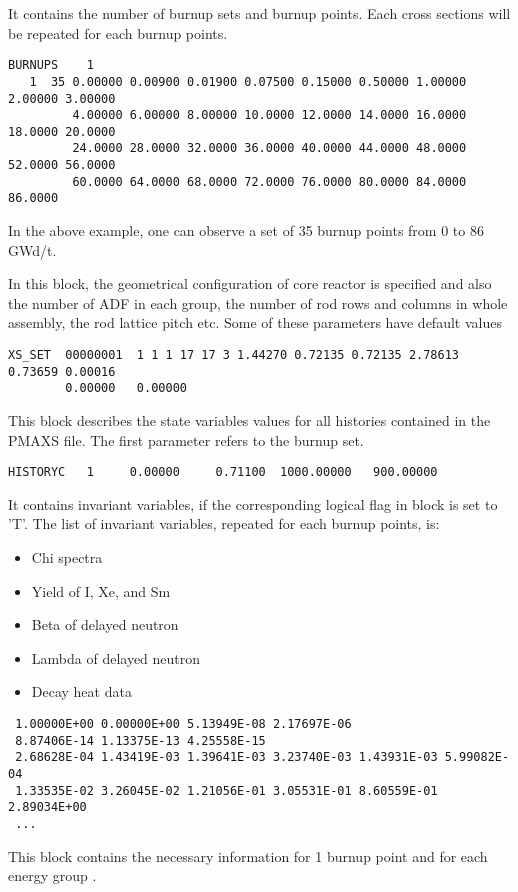 \vskip 0.2cm


It contains the number of burnup sets and burnup points. Each cross sections will be repeated for each burnup points.
\begin{verbatim}
BURNUPS    1
   1  35 0.00000 0.00900 0.01900 0.07500 0.15000 0.50000 1.00000 2.00000 3.00000 
         4.00000 6.00000 8.00000 10.0000 12.0000 14.0000 16.0000 18.0000 20.0000  
         24.0000 28.0000 32.0000 36.0000 40.0000 44.0000 48.0000 52.0000 56.0000 
         60.0000 64.0000 68.0000 72.0000 76.0000 80.0000 84.0000 86.0000
\end{verbatim}
In the above example, one can observe a set of 35 burnup points from 0 to 86 GWd/t.

\vskip 0.2cm


In this block, the geometrical configuration of core reactor is specified and also the number of ADF in each group, the number of rod rows and columns in whole assembly, the rod lattice pitch etc. Some of these parameters have default values
\begin{verbatim}
XS_SET  00000001  1 1 1 17 17 3 1.44270 0.72135 0.72135 2.78613 0.73659 0.00016 
        0.00000   0.00000
\end{verbatim}

\vskip 0.2cm


This block describes the state variables values for all  histories contained in the PMAXS file. The first parameter refers to the burnup set.
\begin{verbatim}
HISTORYC   1     0.00000     0.71100  1000.00000   900.00000
\end{verbatim}

\vskip 0.2cm


It contains invariant variables, if the corresponding logical flag in block  is set to 'T'. The list of invariant variables, repeated for each burnup points, is:


\begin{itemize}
\item Chi spectra
\item Yield of I, Xe, and Sm
\item Beta of delayed neutron
\item Lambda of delayed neutron
\item Decay heat data
\end{itemize}
\begin{verbatim}
 1.00000E+00 0.00000E+00 5.13949E-08 2.17697E-06
 8.87406E-14 1.13375E-13 4.25558E-15
 2.68628E-04 1.43419E-03 1.39641E-03 3.23740E-03 1.43931E-03 5.99082E-04
 1.33535E-02 3.26045E-02 1.21056E-01 3.05531E-01 8.60559E-01 2.89034E+00
 ...
\end{verbatim}
This block contains the necessary information for 1 burnup point and for each energy group .

